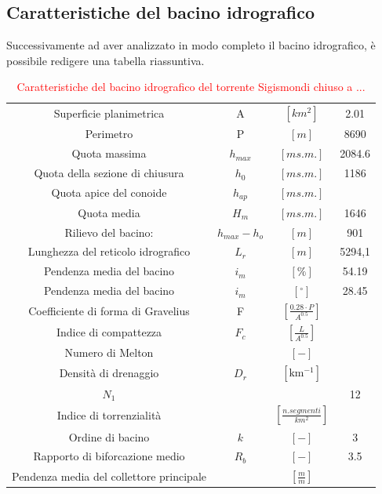 \subsection{Caratteristiche del bacino idrografico}
Successivamente ad aver analizzato in modo completo il bacino idrografico, è possibile redigere una tabella riassuntiva.
\begin{table}[H] \centering
    \caption{\textcolor{red}{Caratteristiche del bacino idrografico  del torrente Sigismondi chiuso a ...}}
    \label{tab:caratteristiche_bacino}
    \begin{tabular}{ cccc } 
    \toprule
    Superficie planimetrica & A &  $\left[km^2\right]$ & 2.01 \\ 
    Perimetro & P & $\left[m\right]$        &      8690       \\ 
    Quota massima & $h_{max}$&  $\left[m s.m.\right]$       &    2084.6     \\
    Quota della sezione di chiusura & $h_0$ & $\left[m s.m.\right]$        &       1186      \\ 
    Quota apice del conoide &$h_{ap}$& $\left[m s.m.\right]$ & \\ 
    Quota media& $H_m$ & $\left[m s.m.\right]$ & 1646    \\ 
    Rilievo del bacino:& $h_{max} - h_o$ & $\left[m\right]$ &   901 \\ 
    Lunghezza del reticolo idrografico& $L_r$& $\left[m\right]$ & 5294,1 \\ 
    Pendenza media del bacino& $i_m$ & $\left[\%\right]$ & 54.19    \\ 
    Pendenza media del bacino& $i_m$& $\left[ ^\circ \right]$ & 28.45   \\ 
    Coefficiente di forma di Gravelius& F& $\left[\frac{0.28 \cdot P}{A^{0.5}} \right]$ & \\  
    Indice di compattezza &$F_c$  & $ \left[\frac{L}{A^{0.5}}\right]$ & \\ 
    Numero di Melton& & $\left[-\right]$ & \\ 
    Densità di drenaggio &$D_r$& $\left[\si{\km^{-1}}\right]$& \\ 
    $N_1$& & & 12 \\ 
    Indice di torrenzialità& &$\left[\frac{n. segmenti }{km^2}\right]$ & \\  
    Ordine di bacino& $k$ & $\left[-\right]$ & 3 \\ 
    Rapporto di biforcazione medio& $R_b$ & $\left[-\right]$ &  3.5 \\  
    Pendenza media del collettore principale & & $\left[\frac{m}{m}\right]$ & \\  
    \bottomrule
\end{tabular}
\end{table}
